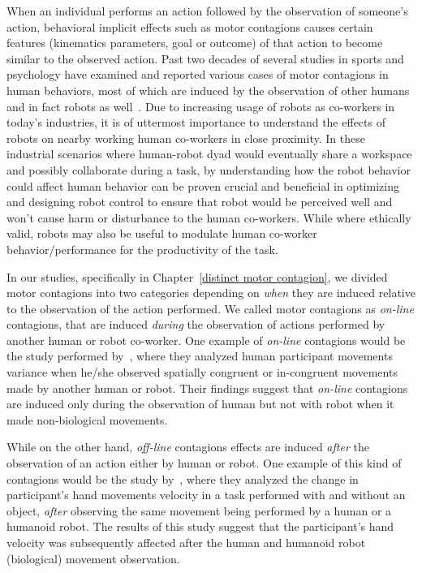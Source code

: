 When an individual performs an action followed by the observation of someone's action, behavioral implicit effects such as motor contagions causes certain features (kinematics parameters, goal or outcome) of that action to become similar to the observed action. Past two decades of several studies in sports and psychology have examined and reported various cases of motor contagions in human behaviors, most of which are induced by the observation of other humans and in fact robots as well~\cite{Becchio:BJN:2007, Hillebrandt:SciReports:2014, Chaminade:BRB:2008, Blakemore:Neuropsychologia:2005, Fadiga:JNeuroPhys:1995, Ganesh:Springer:2015, Sciutti:IJSR:2012, Prinz:EJPAP:1997, edwards2003motor, gray2011hitting}. Due to increasing usage of robots as co-workers in today's industries, it is of uttermost importance to understand the effects of robots on nearby working human co-workers in close proximity. In these industrial scenarios where human-robot dyad would eventually share a workspace and possibly collaborate during a task, by understanding how the robot behavior could affect human behavior can be proven crucial and beneficial in optimizing and designing robot control to ensure that robot would be perceived well and won't cause harm or disturbance to the human co-workers. While where ethically valid, robots may also be useful to modulate human co-worker behavior/performance for the productivity of the task.

In our studies, specifically in Chapter~\ref{distinct motor contagion}, we divided motor contagions into two categories depending on \textit{when} they are induced relative to the observation of the action performed. We called motor contagions as \textit{on-line} contagions, that are induced \textit{during} the observation of actions performed by another human or robot co-worker. One example of \textit{on-line} contagions would be the study performed by~\cite{Kilner:CurBio:2003}, where they analyzed human participant movements variance when he/she observed spatially congruent or in-congruent movements made by another human or robot. Their findings suggest that \textit{on-line} contagions are induced only during the observation of human but not with robot when it made non-biological movements.

While on the other hand, \textit{off-line} contagions effects are induced \textit{after} the observation of an action either by human or robot. One example of this kind of contagions would be the study by~\cite{Bisio:PlosOne:2014}, where they analyzed the change in participant's hand movements velocity in a task performed with and without an object, \textit{after} observing the same movement being performed by a human or a humanoid robot. The results of this study suggest that the participant's hand velocity was subsequently affected after the human and humanoid robot (biological) movement observation.  

